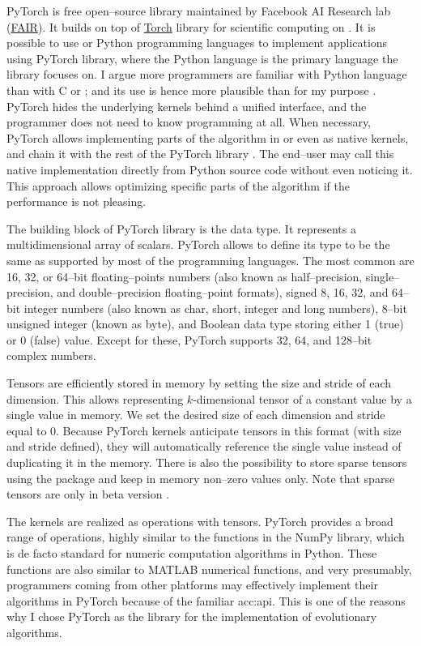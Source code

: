 PyTorch is free open--source library maintained by Facebook AI Research lab (\href{https://ai.facebook.com/}{FAIR}). It builds on top of \href{http://torch.ch/}{Torch} library for scientific computing on \gpuns. It is possible to use \cpp or Python programming languages to implement applications using PyTorch library, where the Python language is the primary language the library focuses on. I argue more programmers are familiar with Python language than with C or \cppns; and its use is hence more plausible than \cuda for my purpose \citep{StackOverflowSurvey}. PyTorch hides the underlying kernels behind a unified interface, and the programmer does not need to know \cuda programming at all. When necessary, PyTorch allows implementing parts of the algorithm in \cpp or even as native \cuda kernels, and chain it with the rest of the PyTorch library \citep{PyTorchDoc}. The end--user may call this native implementation directly from Python source code without even noticing it. This approach allows optimizing specific parts of the algorithm if the performance is not pleasing.

The building block of PyTorch library is the  data type. It represents a multidimensional array of scalars. PyTorch allows to define its type to be the same as supported by most of the programming languages. The most common are 16, 32, or 64--bit floating--points numbers (also known as half--precision, single--precision, and double--precision floating--point formats), signed 8, 16, 32, and 64--bit integer numbers (also known as char, short, integer and long numbers), 8--bit unsigned integer (known as byte), and Boolean data type storing either 1 (true) or 0 (false) value. Except for these, PyTorch supports 32, 64, and 128--bit complex numbers.

Tensors are efficiently stored in memory by setting the size and stride of each dimension. This allows representing $k$-dimensional tensor of a constant value by a single value in memory. We set the desired size of each dimension and stride equal to $0$. Because PyTorch kernels anticipate tensors in this format (with size and stride defined), they will automatically reference the single value instead of duplicating it in the memory. There is also the possibility to store sparse tensors using the  package and keep in memory non--zero values only. Note that sparse tensors are only in beta version \citep{PyTorchDoc}.

The kernels are realized as operations with tensors. PyTorch provides a broad range of operations, highly similar to the functions in the NumPy library, which is de facto standard for numeric computation algorithms in Python. These functions are also similar to MATLAB numerical functions, and very presumably, programmers coming from other platforms may effectively implement their algorithms in PyTorch because of the familiar \acrshort{acc:api}. This is one of the reasons why I chose PyTorch as the library for the implementation of evolutionary algorithms.

